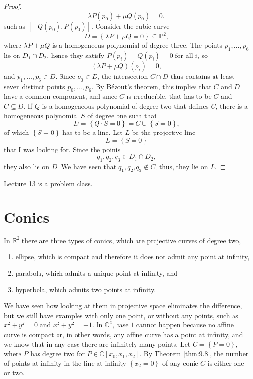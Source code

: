 \documentclass{article}
\newcommand{\R}{\mathbb{R}}
\newcommand{\C}{\mathbb{C}}
\renewcommand{\P}{\mathbb{P}}
\newcommand{\rb}[1]{\left( #1 \right)}
\renewcommand{\sb}[1]{\left[ #1 \right]}
\newcommand{\cb}[1]{\left\{ #1 \right\}}
\theoremstyle{definition}\newtheorem{definition}{Definition}[section]
\theoremstyle{definition}\newtheorem{notation}[definition]{Notation}
\theoremstyle{definition}\newtheorem{remark}[definition]{Remark}
\theoremstyle{definition}\newtheorem{example1}[definition]{Example}
\theoremstyle{definition}\newtheorem{fact}{Fact}
\theoremstyle{definition}\newtheorem{exercise}{Exercise}
\theoremstyle{definition}\newtheorem*{example2}{Example}
\begin{document}
\begin{proof}
$$ \lambda P\rb{p_0} + \mu Q\rb{p_0} = 0, $$
such as $ \sb{-Q\rb{p_0}, P\rb{p_0}} $. Consider the cubic curve
$$ D = \cb{\lambda P + \mu Q = 0} \subseteq \P^2, $$
where $ \lambda P + \mu Q $ is a homogeneous polynomial of degree three. The points $ p_1, \dots, p_6 $ lie on $ D_1 \cap D_2 $, hence they satisfy $ P\rb{p_i} = Q\rb{p_i} = 0 $ for all $ i $, so
$$ \rb{\lambda P + \mu Q}\rb{p_i} = 0, $$
and $ p_1, \dots, p_6 \in D $. Since $ p_0 \in D $, the intersection $ C \cap D $ thus contains at least seven distinct points $ p_0, \dots, p_6 $. By B\'ezout's theorem, this implies that $ C $ and $ D $ have a common component, and since $ C $ is irreducible, that has to be $ C $ and $ C \subseteq D $. If $ Q $ is a homogeneous polynomial of degree two that defines $ C $, there is a homogeneous polynomial $ S $ of degree one such that
$$ D = \cb{Q \cdot S = 0} = C \cup \cb{S = 0}, $$
of which $ \cb{S = 0} $ has to be a line. Let $ L $ be the projective line
$$ L = \cb{S = 0} $$
that I was looking for. Since the points
$$ q_1, q_2, q_3 \in D_1 \cap D_2, $$
they also lie on $ D $. We have seen that $ q_1, q_2, q_3 \notin C $, thus, they lie on $ L $.
\end{proof}


Lecture 13 is a problem class.

\pagebreak

\section{Conics}


In $ \R^2 $ there are three types of conics, which are projective curves of degree two,
\begin{enumerate}
\item ellipse, which is compact and therefore it does not admit any point at infinity,
\item parabola, which admits a unique point at infinity, and
\item hyperbola, which admits two points at infinity.
\end{enumerate}
We have seen how looking at them in projective space eliminates the difference, but we still have examples with only one point, or without any points, such as $ x^2 + y^2 = 0 $ and $ x^2 + y^2 = -1 $. In $ \C^2 $, case $ 1 $ cannot happen because no affine curve is compact or, in other words, any affine curve has a point at infinity, and we know that in any case there are infinitely many points. Let $ C = \cb{P = 0} $, where $ P $ has degree two for $ P \in \C\sb{x_0, x_1, x_2} $. By Theorem \ref{thm:9.8}, the number of points at infinity in the line at infinity $ \cb{x_2 = 0} $ of any conic $ C $ is either one or two.
\end{document}
